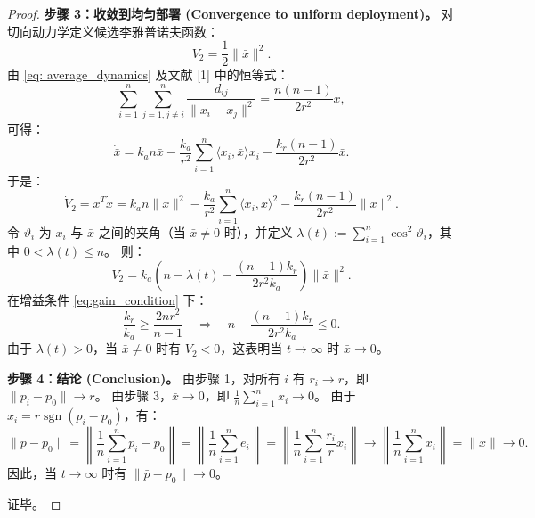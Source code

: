 \documentclass{ctexart}
\DeclareMathOperator{\sgn}{sgn}
\begin{document}
\begin{proof}
\textbf{步骤 3：收敛到均匀部署 (Convergence to uniform deployment)。}
对切向动力学定义候选李雅普诺夫函数：
\begin{equation}
V_2 = \frac{1}{2} \|\bar{x}\|^2.
\end{equation}
由 \eqref{eq: average_dynamics} 及文献 [1] 中的恒等式：
\begin{equation}
\sum_{i=1}^{n} \sum_{j=1, j \neq i}^{n} \frac{d_{ij}}{\|x_i - x_j\|^2} = \frac{n(n-1)}{2r^2} \bar{x},
\end{equation}
可得：
\begin{equation}
\dot{\bar{x}} = k_a n \bar{x} - \frac{k_a}{r^2} \sum_{i=1}^{n} \langle x_i, \bar{x} \rangle x_i - \frac{k_r(n-1)}{2r^2} \bar{x}.
\end{equation}
于是：
\begin{equation}
\dot{V}_2 = \bar{x}^T \dot{\bar{x}} = k_a n \|\bar{x}\|^2 - \frac{k_a}{r^2} \sum_{i=1}^{n} \langle x_i, \bar{x} \rangle^2 - \frac{k_r(n-1)}{2r^2} \|\bar{x}\|^2.
\end{equation}
令 $\vartheta_i$ 为 $x_i$ 与 $\bar{x}$ 之间的夹角（当 $\bar{x} \neq 0$ 时），并定义 $\lambda(t) := \sum_{i=1}^{n} \cos^2 \vartheta_i$，其中 $0 < \lambda(t) \leq n$。
则：
\begin{equation}
\dot{V}_2 = k_a \left(n - \lambda(t) - \frac{(n-1)k_r}{2r^2 k_a}\right) \|\bar{x}\|^2.
\end{equation}
在增益条件 \eqref{eq:gain_condition} 下：
\begin{equation}
\frac{k_r}{k_a} \geq \frac{2n r^2}{n-1} \quad \Rightarrow \quad n - \frac{(n-1)k_r}{2r^2 k_a} \leq 0.
\end{equation}
由于 $\lambda(t) > 0$，当 $\bar{x} \neq 0$ 时有 $\dot{V}_2 < 0$，这表明当 $t \to \infty$ 时 $\bar{x} \to 0$。

\textbf{步骤 4：结论 (Conclusion)。}
由步骤 1，对所有 $i$ 有 $r_i \to r$，即 $\|p_i - p_0\| \to r$。
由步骤 3，$\bar{x} \to 0$，即 $\frac{1}{n} \sum_{i=1}^{n} x_i \to 0$。
由于 $x_i = r \sgn(p_i - p_0)$，有：
\begin{equation}
\|\bar{p} - p_0\| = \left\| \frac{1}{n} \sum_{i=1}^{n} p_i - p_0 \right\| = \left\| \frac{1}{n} \sum_{i=1}^{n} e_i \right\| = \left\| \frac{1}{n} \sum_{i=1}^{n} \frac{r_i}{r} x_i \right\| \to \left\| \frac{1}{n} \sum_{i=1}^{n} x_i \right\| = \|\bar{x}\| \to 0.
\end{equation}
因此，当 $t \to \infty$ 时有 $\|\bar{p} - p_0\| \to 0$。

证毕。
\end{proof}
\end{document}
